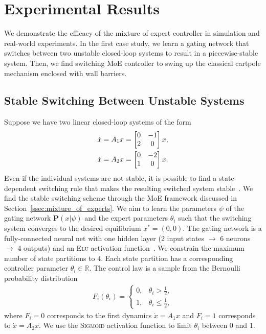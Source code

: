 \section{Experimental Results}
\label{sec:moe_results}
We demonstrate the efficacy of the mixture of expert controller in simulation
and real-world experiments.
%
In the first case study, we learn a gating network that switches between two
unstable closed-loop systems to result in a piecewise-stable system.
%
Then, we find switching MoE controller to swing up the classical cartpole
mechanism enclosed with wall barriers.
%

\subsection{Stable Switching Between Unstable Systems}

Suppose we have two linear closed-loop systems of the form 
\begin{equation}
    \begin{gathered}
        \dot{x} = A_1x = \begin{bmatrix}0 & -1 \\ 2 & 0\end{bmatrix}x, \\
        \dot{x} = A_2x = \begin{bmatrix}0 & -2 \\ 1 & 0\end{bmatrix}x.
    \end{gathered}
    \label{eq:unstable_closedloop}
\end{equation}
%
Even if the individual systems are not stable, it is possible to find a
state-dependent switching rule that makes the resulting switched system
stable~\cite{liberzon2003switching}. 
%
We find the stable switching scheme through the MoE framework discussed in
Section~\ref{ssec:mixture_of_experts}.
%
We aim to learn the parameters $\psi$ of the gating network $\mathbf{P}(x|
\psi)$ and the expert parameters $\theta_i$ such that the switching system
converges to the desired equilibrium $x^* = (0, 0)$.
%
The gating network is a fully-connected neural net with one hidden layer (2 input states 
$\rightarrow$ 6 neurons $\rightarrow$ 4 outputs) and an \textsc{Elu} activation
function~\cite{clevert2015fast}.
%
We constrain the maximum number of state partitions to $4$.
%
Each state partition has a corresponding controller parameter $\theta_i \in
\mathbb{R}$. 
%
The control law is a sample from the Bernoulli probability distribution
\begin{align}
    F_i(\theta_i) = \begin{cases}
       0, & \theta_i > \frac{1}{2}, \\
       1, & \theta_i \leq \frac{1}{2},
    \end{cases}
    \label{eq:bernoulli}
\end{align}
\noindent where $F_i = 0$ corresponds to the first dynamics $\dot{x} = A_1
x$ and $F_i=1$ corresponds to $\dot{x} = A_2x$.
%
We use the \textsc{Sigmoid} activation function to limit $\theta_i$ between 0
and 1.

